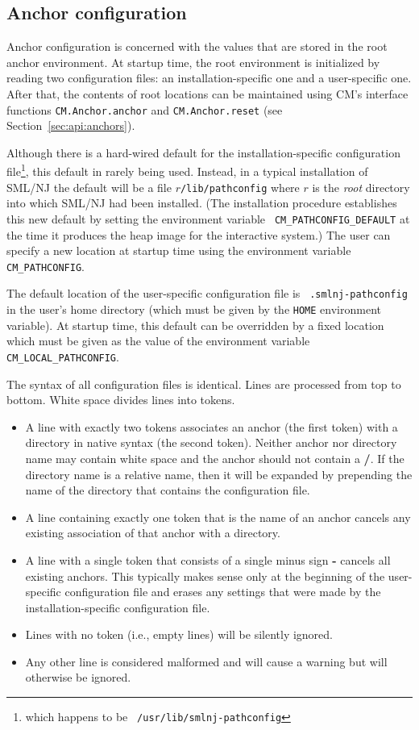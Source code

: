 \subsection{Anchor configuration}
\label{sec:anchor:config}

Anchor configuration is concerned with the values that are stored in
the root anchor environment.  At startup time, the root environment is
initialized by reading two configuration files: an
installation-specific one and a user-specific one.  After that, the
contents of root locations can be maintained using CM's interface
functions {\tt CM.Anchor.anchor} and {\tt CM.Anchor.reset} (see
Section~\ref{sec:api:anchors}).

Although there is a hard-wired default for the installation-specific
configuration file\footnote{which happens to be {\tt
/usr/lib/smlnj-pathconfig}}, this default in rarely being used.
Instead, in a typical installation of SML/NJ the default will be a
file $r${\tt /lib/pathconfig} where $r$ is the {\it root} directory
into which SML/NJ had been installed.  (The installation procedure
establishes this new default by setting the environment variable {\tt
CM\_PATHCONFIG\_DEFAULT} at the time it produces the heap image for
the interactive system.)  The user can specify a new location at
startup time using the environment variable {\tt CM\_PATHCONFIG}.

The default location of the user-specific configuration file is {\tt
.smlnj-pathconfig} in the user's home directory (which must be given
by the {\tt HOME} environment variable).  At startup time, this
default can be overridden by a fixed location which must be given as
the value of the environment variable {\tt CM\_LOCAL\_PATHCONFIG}.

The syntax of all configuration files is identical.  Lines are
processed from top to bottom. White space divides lines into tokens.
\begin{itemize}
\item A line with exactly two tokens associates an anchor (the first
token) with a directory in native syntax (the second token).  Neither
anchor nor directory name may contain white space and the anchor
should not contain a {\bf /}.  If the directory name is a relative
name, then it will be expanded by prepending the name of the directory
that contains the configuration file.
\item A line containing exactly one token that is the name of an
anchor cancels any existing association of that anchor with a
directory.
\item A line with a single token that consists of a single minus sign
{\bf -} cancels all existing anchors.  This typically makes sense only
at the beginning of the user-specific configuration file and
erases any settings that were made by the installation-specific
configuration file.
\item Lines with no token (i.e., empty lines) will be silently ignored.
\item Any other line is considered malformed and will cause a warning
but will otherwise be ignored.
\end{itemize}

